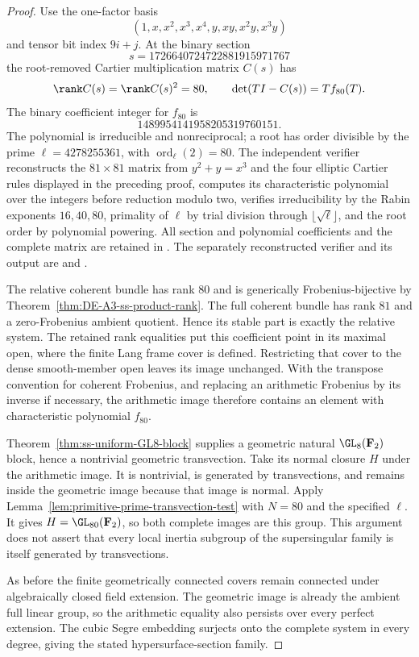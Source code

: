 \begin{proof}
Use the one-factor basis
\[
                  (1,x,x^2,x^3,x^4,y,xy,x^2y,x^3y)
\]
and tensor bit index $9i+j$.
At the binary section
\[
                      s=1726640724722881915971767
\]
the root-removed Cartier multiplication matrix $C(s)$ has
\[
       \rank C(s)=\rank C(s)^2=80,
       \qquad \det(TI-C(s))=T f_{80}(T).
\]
The binary coefficient integer for $f_{80}$ is
\[
                         1489954141958205319760151.
\]
The polynomial is irreducible and nonreciprocal; a root has order
divisible by the prime $\ell=4278255361$, with
$\operatorname{ord}_{\ell}(2)=80$.
The independent verifier reconstructs the $81\times81$ matrix from
$y^2+y=x^3$ and the four elliptic Cartier rules displayed in the
preceding proof, computes its characteristic polynomial over the
integers before reduction modulo two, verifies irreducibility by the
Rabin exponents $16,40,80$, primality of $\ell$ by trial division through
$\lfloor\sqrt\ell\rfloor$, and the root order by polynomial powering.
All section and polynomial coefficients and the complete matrix are
retained in
.
The separately reconstructed verifier and its output are
and
.

The relative coherent bundle has rank $80$ and is generically
Frobenius-bijective by Theorem~\ref{thm:DE-A3-ss-product-rank}.
The full coherent bundle has rank $81$ and a zero-Frobenius ambient
quotient. Hence its stable part is exactly the relative system.
The retained rank equalities put this coefficient point in its maximal
open, where the finite Lang frame cover is defined. Restricting that
cover to the dense smooth-member open leaves its image unchanged.
With the transpose convention for coherent Frobenius, and replacing
an arithmetic Frobenius by its inverse if necessary, the arithmetic
image therefore contains an element with characteristic polynomial
$f_{80}$.

Theorem~\ref{thm:ss-uniform-GL8-block} supplies a geometric natural
$\GL_8(\mathbf F_2)$ block, hence a nontrivial geometric transvection.
Take its normal closure $H$ under the arithmetic image. It is nontrivial,
is generated by transvections, and remains inside the geometric image
because that image is normal. Apply
Lemma~\ref{lem:primitive-prime-transvection-test} with $N=80$ and the
specified $\ell$. It gives $H=\GL_{80}(\mathbf F_2)$, so both complete
images are this group. This argument does not assert that every local
inertia subgroup of the supersingular family is itself generated by
transvections.

As before the finite geometrically connected covers remain connected
under algebraically closed field extension. The geometric image is
already the ambient full linear group, so the arithmetic equality also
persists over every perfect extension. The cubic Segre embedding
surjects onto the complete system in every degree, giving the stated
hypersurface-section family.
\end{proof}

